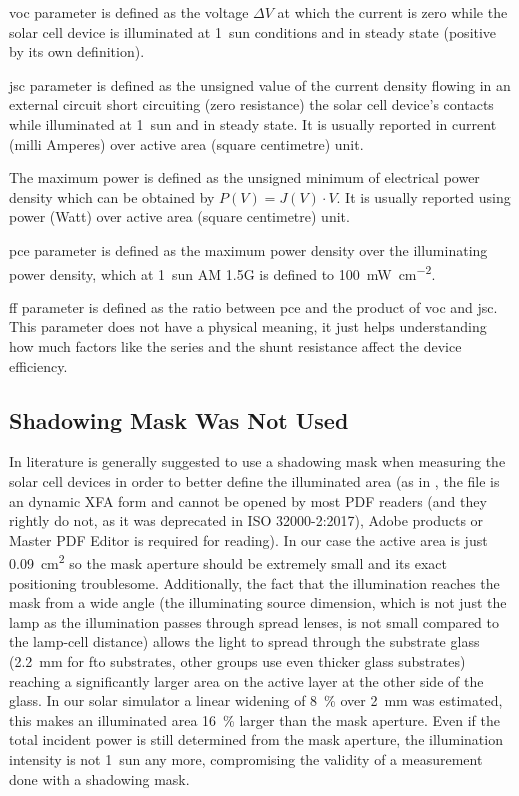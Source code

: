 		\Gls{voc} parameter is defined as the voltage $\Delta V$ at which the current is zero while the solar cell device is illuminated at 1~sun conditions and in steady state (positive by its own definition).

\Gls{jsc} parameter is defined as the unsigned value of the current density flowing in an external circuit short circuiting (zero resistance) the solar cell device's contacts while illuminated at 1~sun and in steady state. It is usually reported in current (milli Amperes) over active area (square centimetre) unit.

The maximum power is defined as the unsigned minimum of electrical power density which can be obtained by $P(V) = J(V) \cdot V$. It is usually reported using power (Watt) over active area (square centimetre) unit.

\Gls{pce} parameter is defined as the maximum power density over the illuminating power density, which at 1~sun AM 1.5G is defined to \SI{100}{\mW\per\square\cm}.

\Gls{ff} parameter is defined as the ratio between \gls{pce} and the product of \gls{voc} and \gls{jsc}. This parameter does not have a physical meaning, it just helps understanding how much factors like the series and the shunt resistance affect the device efficiency.

	\subsection{Shadowing Mask Was Not Used}
	
		In literature is generally suggested to use a shadowing mask when measuring the solar cell devices in order to better define the illuminated area (as in \cite{NatureResearch2017}, the file is an dynamic XFA form and cannot be opened by most PDF readers (and they rightly do not, as it was deprecated in ISO 32000-2:2017), Adobe products or Master PDF Editor is required for reading). In our case the active area is just \SI{0.09}{\square\cm} so the mask aperture should be extremely small and its exact positioning troublesome. Additionally, the fact that the illumination reaches the mask from a wide angle (the illuminating source dimension, which is not just the lamp as the illumination passes through spread lenses, is not small compared to the lamp-cell distance) allows the light to spread through the substrate glass (\SI{2.2}{\mm} for \gls{fto} substrates, other groups use even thicker glass substrates) reaching a significantly larger area on the active layer at the other side of the glass. In our solar simulator a linear widening of 8~\% over \SI{2}{\mm} was estimated, this makes an illuminated area 16~\% larger than the mask aperture. Even if the total incident power is still determined from the mask aperture, the illumination intensity is not 1~sun any more, compromising the validity of a measurement done with a shadowing mask.

